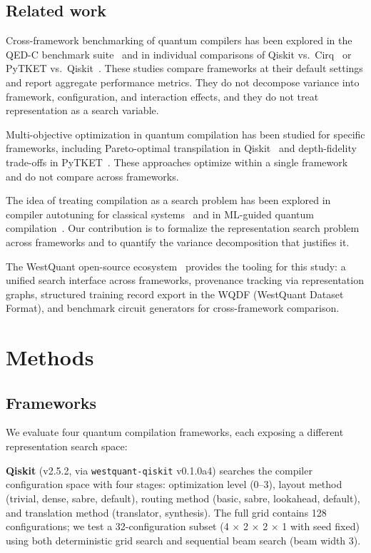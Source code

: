 \documentclass[11pt,a4paper]{article}
\begin{document}
\subsection{Related work}

Cross-framework benchmarking of quantum compilers has been explored in the QED-C benchmark suite~\cite{ref5} and in individual comparisons of Qiskit vs.\ Cirq~\cite{ref6} or PyTKET vs.\ Qiskit~\cite{ref7}. These studies compare frameworks at their default settings and report aggregate performance metrics. They do not decompose variance into framework, configuration, and interaction effects, and they do not treat representation as a search variable.

Multi-objective optimization in quantum compilation has been studied for specific frameworks, including Pareto-optimal transpilation in Qiskit~\cite{ref8} and depth-fidelity trade-offs in PyTKET~\cite{ref9}. These approaches optimize within a single framework and do not compare across frameworks.

The idea of treating compilation as a search problem has been explored in compiler autotuning for classical systems~\cite{ref10} and in ML-guided quantum compilation~\cite{ref11}. Our contribution is to formalize the representation search problem across frameworks and to quantify the variance decomposition that justifies it.

The WestQuant open-source ecosystem~\cite{ref12} provides the tooling for this study: a unified search interface across frameworks, provenance tracking via representation graphs, structured training record export in the WQDF (WestQuant Dataset Format), and benchmark circuit generators for cross-framework comparison.


\section{Methods}

\subsection{Frameworks}

We evaluate four quantum compilation frameworks, each exposing a different representation search space:

\textbf{Qiskit} (v2.5.2, via \texttt{westquant-qiskit} v0.1.0a4) searches the compiler configuration space with four stages: optimization level (0--3), layout method (trivial, dense, sabre, default), routing method (basic, sabre, lookahead, default), and translation method (translator, synthesis). The full grid contains 128 configurations; we test a 32-configuration subset (4 $\times$ 2 $\times$ 2 $\times$ 1 with seed fixed) using both deterministic grid search and sequential beam search (beam width 3).
\end{document}

